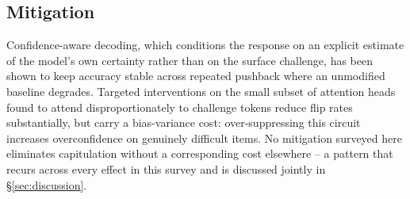 \subsection{Mitigation}
\label{sec:epistemic_capitulation_mitigation}

Confidence-aware decoding, which conditions the response on an explicit estimate of
the model's own certainty rather than on the surface challenge, has been shown to
keep accuracy stable across repeated pushback where an unmodified baseline
degrades. Targeted interventions on the small subset of attention heads found to
attend disproportionately to challenge tokens reduce flip rates substantially, but
carry a bias-variance cost: over-suppressing this circuit increases overconfidence
on genuinely difficult items. No mitigation surveyed here eliminates capitulation
without a corresponding cost elsewhere -- a pattern that recurs across every effect
in this survey and is discussed jointly in \S\ref{sec:discussion}.
